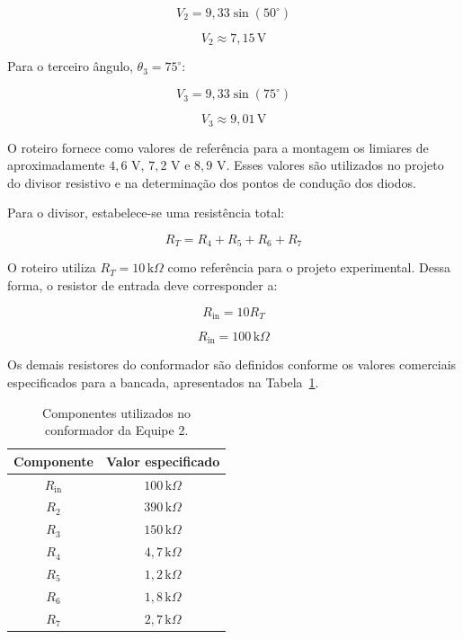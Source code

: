 \documentclass[11pt,a4paper]{article}
\begin{document}
\begin{equation}
V_2=9,33\sin(50^\circ)
\end{equation}

\begin{equation}
\boxed{V_2\approx7,15\,\text{V}}
\end{equation}

Para o terceiro ângulo, $\theta_3=75^\circ$:

\begin{equation}
V_3=9,33\sin(75^\circ)
\end{equation}

\begin{equation}
\boxed{V_3\approx9,01\,\text{V}}
\end{equation}

O roteiro fornece como valores de referência para a montagem os limiares de aproximadamente $4,6$ V, $7,2$ V e $8,9$ V. Esses valores são utilizados no projeto do divisor resistivo e na determinação dos pontos de condução dos diodos.

Para o divisor, estabelece-se uma resistência total:

\begin{equation}
R_T=R_4+R_5+R_6+R_7
\end{equation}

O roteiro utiliza $R_T=10\,\text{k}\Omega$ como referência para o projeto experimental. Dessa forma, o resistor de entrada deve corresponder a:

\begin{equation}
R_{\text{in}}=10R_T
\end{equation}

\begin{equation}
\boxed{R_{\text{in}}=100\,\text{k}\Omega}
\end{equation}

Os demais resistores do conformador são definidos conforme os valores comerciais especificados para a bancada, apresentados na Tabela~\ref{tab:conformador}.

\begin{table}[htbp]
\centering
\caption{Componentes utilizados no conformador da Equipe 2.}
\label{tab:conformador}
\begin{tabular}{cc}
\hline
\textbf{Componente} & \textbf{Valor especificado} \\
\hline
$R_{\text{in}}$ & $100\,\text{k}\Omega$ \\
$R_2$ & $390\,\text{k}\Omega$ \\
$R_3$ & $150\,\text{k}\Omega$ \\
$R_4$ & $4,7\,\text{k}\Omega$ \\
$R_5$ & $1,2\,\text{k}\Omega$ \\
$R_6$ & $1,8\,\text{k}\Omega$ \\
$R_7$ & $2,7\,\text{k}\Omega$ \\
\hline
\end{tabular}
\end{table}
\end{document}
